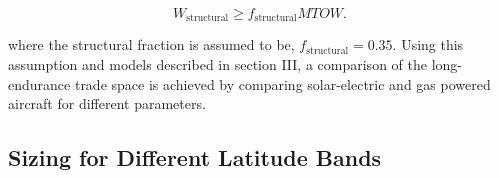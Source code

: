 \documentclass[]{aiaa-tc}%
\begin{document}
\begin{equation}
    \label{e:structualfraction}
    W_{\text{structural}} \geq f_{\text{structural}}MTOW.
\end{equation}

where the structural fraction is assumed to be, $f_{\text{structural}} = 0.35$. Using this assumption and models described in section III, a comparison of the long-endurance trade space is achieved by comparing solar-electric and gas powered aircraft for different parameters. 



\subsection{Sizing for Different Latitude Bands}
\end{document}
